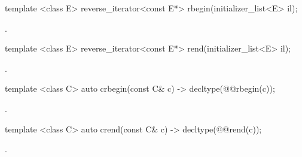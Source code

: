 %
\begin{itemdecl}
template <class E> reverse_iterator<const E*> rbegin(initializer_list<E> il);
\end{itemdecl}
\begin{itemdescr}
\pnum \returns {}.
\end{itemdescr}

%
\begin{itemdecl}
template <class E> reverse_iterator<const E*> rend(initializer_list<E> il);
\end{itemdecl}
\begin{itemdescr}
\pnum \returns {}.
\end{itemdescr}

%
\begin{itemdecl}
template <class C> auto crbegin(const C& c) -> decltype(@@rbegin(c));
\end{itemdecl}
\begin{itemdescr}
\pnum \returns {}.
\end{itemdescr}

%
\begin{itemdecl}
template <class C> auto crend(const C& c) -> decltype(@@rend(c));
\end{itemdecl}
\begin{itemdescr}
\pnum \returns {}.
\end{itemdescr}
